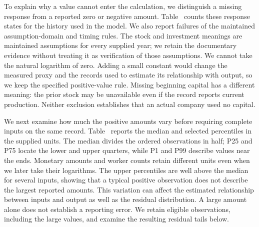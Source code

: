 To explain why a value cannot enter the calculation, we distinguish a missing response from a reported zero or negative amount. Table~ counts these response states for the history used in the model. We also report failures of the maintained assumption-domain and timing rules. The stock and investment meanings are maintained assumptions for every supplied year; we retain the documentary evidence without treating it as verification of those assumptions.
We cannot take the natural logarithm of zero. Adding a small constant would change the measured proxy and the records used to estimate its relationship with output, so we keep the specified positive-value rule. Missing beginning capital has a different meaning: the prior stock may be unavailable even if the record reports current production. Neither exclusion establishes that an actual company used no capital.

We next examine how much the positive amounts vary before requiring complete inputs on the same record. Table~ reports the median and selected percentiles in the supplied units. The median divides the ordered observations in half; P25 and P75 locate the lower and upper quarters, while P1 and P99 describe values near the ends. Monetary amounts and worker counts retain different units even when we later take their logarithms.
The upper percentiles are well above the median for several inputs, showing that a typical positive observation does not describe the largest reported amounts. This variation can affect the estimated relationship between inputs and output as well as the residual distribution. A large amount alone does not establish a reporting error. We retain eligible observations, including the large values, and examine the resulting residual tails below.

